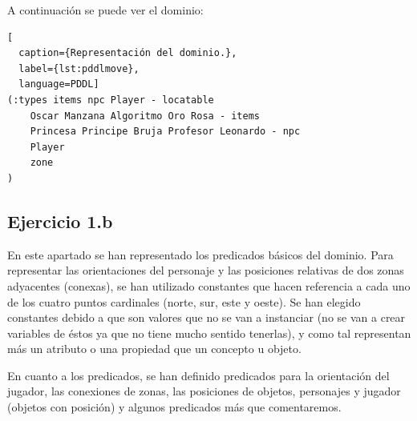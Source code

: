 \documentclass[11pt,a4paper]{article}
\begin{document}
A continuación se puede ver el dominio:

\begin{algorithm}[H]
\begin{lstlisting}[
  caption={Representación del dominio.},
  label={lst:pddlmove},
  language=PDDL]
(:types items npc Player - locatable
  	Oscar Manzana Algoritmo Oro Rosa - items
  	Princesa Principe Bruja Profesor Leonardo - npc
  	Player
  	zone
)
\end{lstlisting}
\end{algorithm}

\subsection{Ejercicio 1.b}

En este apartado se han representado los predicados básicos del dominio. Para representar las orientaciones del personaje y 
las posiciones relativas de dos zonas adyacentes (conexas), se han utilizado constantes que hacen referencia a cada uno de los
cuatro puntos cardinales (norte, sur, este y oeste). Se han elegido constantes debido a que son valores que no se van a instanciar
(no se van a crear variables de éstos ya que no tiene mucho sentido tenerlas), y como tal representan más un atributo o una propiedad
que un concepto u objeto.

En cuanto a los predicados, se han definido predicados para la orientación del jugador, las conexiones de zonas, las posiciones de
objetos, personajes y jugador (objetos con posición) y algunos predicados más que comentaremos.
\end{document}
